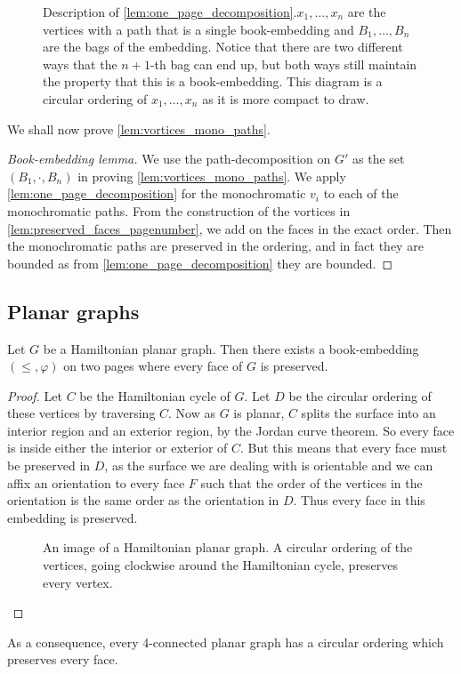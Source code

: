\begin{figure}
	\centering
	
	\caption{Description of \cref{lem:one_page_decomposition}.\(x_1, \ldots, x_n\) are the vertices with a path that is a single book-embedding and \(B_1, \ldots, B_n\) are the bags of the embedding. Notice that there are two different ways that the \(n + 1\)-th bag can end up, but both ways still maintain the property that this is a book-embedding. This diagram is a circular ordering of \(x_1, \ldots, x_n\) as it is more compact to draw.}\label{fig:preserving_pages}
\end{figure}

We shall now prove \cref{lem:vortices_mono_paths}.
\begin{proof}[Book-embedding lemma]
	We use the path-decomposition on \(G'\) as the set \((B_1, \cdot , B_n)\) in proving \cref{lem:vortices_mono_paths}. We apply \cref{lem:one_page_decomposition} for the monochromatic \(v_i\) to each of the monochromatic paths. From the construction of the vortices in \cref{lem:preserved_faces_pagenumber}, we add on the faces in the exact order. Then the monochromatic paths are preserved in the ordering, and in fact they are bounded as from \cref{lem:one_page_decomposition} they are bounded.
\end{proof}
\subsection{Planar graphs}
\begin{lemma}\label{lem:Hamiltonian_preserved_faces}
	Let \(G\) be a Hamiltonian planar graph. Then there exists a book-embedding $(\leq, \varphi)$ on two pages where every face of $G$ is preserved.
\end{lemma}

\begin{proof}
	Let \(C\) be the Hamiltonian cycle of \(G\). Let \(D\) be the circular ordering of these vertices by traversing \(C\). Now as \(G\) is planar, \(C\) splits the surface into an interior region and an exterior region, by the Jordan curve theorem. So every face is inside either the interior or exterior of \(C\). But this means that every face must be preserved in \(D\), as the surface we are dealing with is orientable and we can affix an orientation to every face \(F\) such that the order of the vertices in the orientation is the same order as the orientation in \(D\). Thus every face in this embedding is preserved.
	\begin{figure}[h]
		\centering
		
		\caption{An image of a Hamiltonian planar graph. A circular ordering of the vertices, going clockwise around the Hamiltonian cycle, preserves every vertex.}\label{fig:hamiltonian_planar}
	\end{figure}
\end{proof}
As a consequence, every 4-connected planar graph has a circular ordering which preserves every face.

